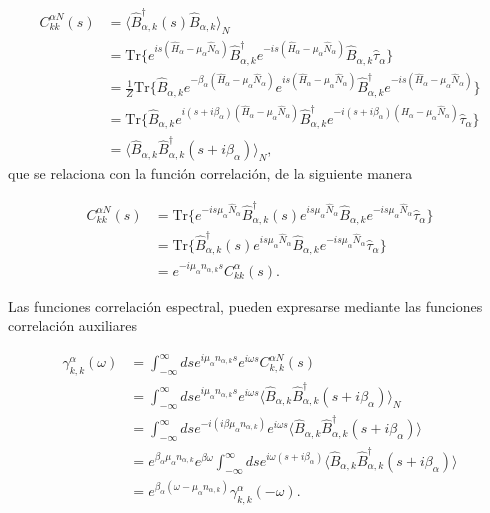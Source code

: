 \begin{appendixs}
\begin{align*}
    C^{\alpha N}_{kk}(s) & =  \langle \hat{B}^{\dagger}_{\alpha,k}(s)\hat{B}_{\alpha,k} \rangle_{N} \\
   &  = \text{Tr}\{e^{is(\hat{H}_{\alpha} - \mu_{\alpha}\hat{N}_{\alpha})}\hat{B}^{\dagger}_{\alpha,k}e^{-is(\hat{H}_{\alpha} - \mu_{\alpha}\hat{N}_{\alpha})}\hat{B}_{\alpha,k}\hat{\tau}_{\alpha}  \} \\
   & = \frac{1}{Z}\text{Tr}\{\hat{B}_{\alpha,k} e^{-\beta_{\alpha}(\hat{H}_{\alpha} - \mu_{\alpha}\hat{N}_{\alpha})} e^{is(\hat{H}_{\alpha} - \mu_{\alpha}\hat{N}_{\alpha})}\hat{B}^{\dagger}_{\alpha,k}e^{-is(\hat{H}_{\alpha} - \mu_{\alpha}\hat{N}_{\alpha})}\} \\
   & = \text{Tr}\{\hat{B}_{\alpha,k}e^{i(s+i\beta_{\alpha})(\hat{H}_{\alpha} - \mu_{\alpha}\hat{N}_{\alpha})}\hat{B}^{\dagger}_{\alpha,k}e^{-i(s+i\beta_{\alpha})(\hat{H}_{\alpha} - \mu_{\alpha}\hat{N}_{\alpha})}\hat{\tau}_{\alpha} \} \\
   & = \langle \hat{B}_{\alpha,k} \hat{B}^{\dagger}_{\alpha,k}(s+i\beta_{\alpha})\rangle_{N},
\end{align*}
que se relaciona con la función correlación, de la siguiente manera 

\begin{align*}
    C^{\alpha N}_{kk}(s) & = \text{Tr}\{e^{-is\mu_{\alpha}\hat{N}_{\alpha} }\hat{B}^{\dagger}_{\alpha,k}(s)e^{is\mu_{\alpha}\hat{N}_{\alpha}} \hat{B}_{\alpha,k}e^{-is\mu_{\alpha}\hat{N}_{\alpha} }\hat{\tau}_{\alpha}   \} \\
 & = \text{Tr}\{\hat{B}^{\dagger}_{\alpha,k}(s)e^{is\mu_{\alpha}\hat{N}_{\alpha}} \hat{B}_{\alpha,k}e^{-is\mu_{\alpha}\hat{N}_{\alpha}}\hat{\tau}_{\alpha}   \}\\
 & = e^{-i\mu_{\alpha}n_{\alpha,k}s} C^{\alpha}_{kk}(s).
\end{align*}

Las funciones correlación espectral, pueden expresarse mediante las funciones correlación auxiliares

\begin{align*}
    \gamma^{\alpha}_{k,k}(\omega) & = \int_{-\infty}^{\infty}ds e^{i\mu_{\alpha}n_{\alpha,k}s} e^{i\omega s}C^{\alpha N}_{k,k}(s) \\
    & = \int_{-\infty}^{\infty}ds e^{i\mu_{\alpha}n_{\alpha,k}s} e^{i\omega s}\langle \hat{B}_{\alpha,k} \hat{B}^{\dagger}_{\alpha,k}(s+i\beta_{\alpha}) \rangle_{N} \\
    & = \int_{-\infty}^{\infty}ds e^{-i(i\beta \mu_{\alpha}n_{\alpha,k})} e^{i\omega s} \langle \hat{B}_{\alpha,k}\hat{B}^{\dagger}_{\alpha,k}(s+i\beta_{\alpha}) \rangle \\
    & = e^{\beta_{\alpha}\mu_{\alpha}n_{\alpha,k}}e^{\beta \omega} \int_{-\infty}^{\infty} ds e^{i\omega(s+i\beta_{\alpha})} \langle \hat{B}_{\alpha,k}\hat{B}^{\dagger}_{\alpha,k}(s+i\beta_{\alpha}) \rangle \\
    & = e^{\beta_{\alpha}(\omega - \mu_{\alpha}n_{\alpha,k})} \gamma^{\alpha}_{k,k}(-\omega).
\end{align*}



\end{appendixs}
